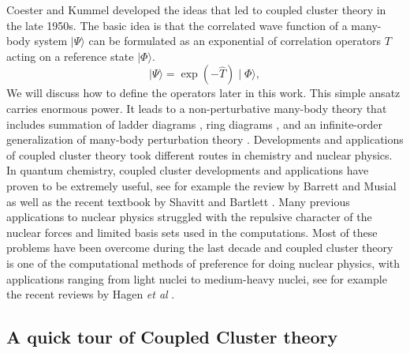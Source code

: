 Coester and Kummel developed the ideas that led to coupled cluster
theory in the late 1950s. The basic idea is that the correlated wave function
of a many-body system $\mid\Psi\rangle$
can be formulated as an exponential of correlation
operators $T$ acting on a reference state $\mid\Phi\rangle$.
\begin{equation}
\mid\Psi\rangle = \exp\left(-\hat{T}\right)\mid\Phi\rangle,
\end{equation}
We will discuss how to define the operators later in this work. This simple
ansatz carries enormous power. It leads to a non-perturbative many-body
theory that includes summation of ladder diagrams \cite{brueckner1955}, ring
diagrams \cite{GB1957}, and an infinite-order
generalization of many-body perturbation theory
\cite{Bart_silver74, Bart_silver76}.
Developments and applications of coupled cluster theory took
different routes in chemistry and nuclear physics. In quantum
chemistry, coupled cluster developments and applications have proven
to be extremely useful, see for example the review by Barrett and
Musial as well as the recent textbook by Shavitt and Bartlett \cite{shavittbartlett2009}.
Many previous applications to nuclear physics struggled with the
repulsive character of the nuclear forces and limited basis sets
used in the computations. Most of these problems have been overcome
during the last decade and coupled cluster theory is one of the
computational methods of preference for doing nuclear physics, with
  applications ranging from light nuclei to medium-heavy nuclei, see
  for example the recent reviews by Hagen {\em et al} \cite{papenbrock2014,hagen2016}.


\subsection{A quick tour of Coupled Cluster theory}

